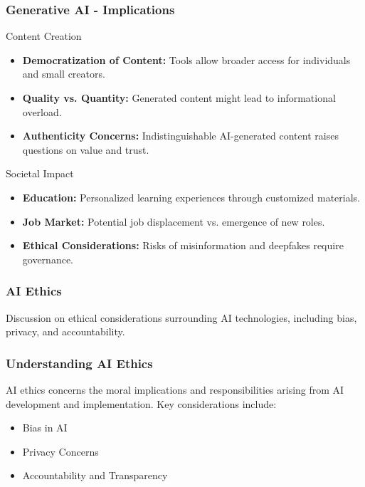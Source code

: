 \documentclass[aspectratio=169]{beamer}
\begin{document}
\begin{frame}[fragile]
    \frametitle{Generative AI - Implications}
    \begin{block}{Content Creation}
        \begin{itemize}
            \item \textbf{Democratization of Content:} Tools allow broader access for individuals and small creators.
            \item \textbf{Quality vs. Quantity:} Generated content might lead to informational overload.
            \item \textbf{Authenticity Concerns:} Indistinguishable AI-generated content raises questions on value and trust.
        \end{itemize}
    \end{block}
    \begin{block}{Societal Impact}
        \begin{itemize}
            \item \textbf{Education:} Personalized learning experiences through customized materials.
            \item \textbf{Job Market:} Potential job displacement vs. emergence of new roles.
            \item \textbf{Ethical Considerations:} Risks of misinformation and deepfakes require governance.
        \end{itemize}
    \end{block}
\end{frame}

\begin{frame}[fragile]
    \frametitle{AI Ethics}
    Discussion on ethical considerations surrounding AI technologies, including bias, privacy, and accountability.
\end{frame}

\begin{frame}[fragile]
    \frametitle{Understanding AI Ethics}
    AI ethics concerns the moral implications and responsibilities arising from AI development and implementation. Key considerations include:
    \begin{itemize}
        \item Bias in AI
        \item Privacy Concerns
        \item Accountability and Transparency
    \end{itemize}
\end{frame}
\end{document}
